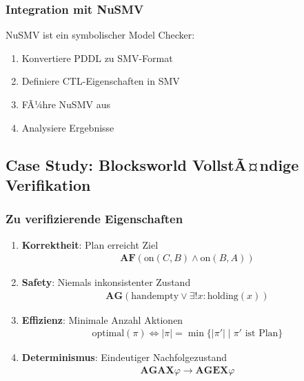 ﻿\documentclass[a4paper,12pt]{article}
\theoremstyle{definition}
\begin{document}
\subsubsection{Integration mit NuSMV}

NuSMV ist ein symbolischer Model Checker:

\begin{enumerate}
	\item Konvertiere PDDL zu SMV-Format
	\item Definiere CTL-Eigenschaften in SMV
	\item FÃ¼hre NuSMV aus
	\item Analysiere Ergebnisse
\end{enumerate}

\subsection{Case Study: Blocksworld VollstÃ¤ndige Verifikation}

\subsubsection{Zu verifizierende Eigenschaften}

\begin{enumerate}
	\item \textbf{Korrektheit}: Plan erreicht Ziel
	\begin{align}
	\mathbf{AF}(\text{on}(C, B) \land \text{on}(B, A))
	\end{align}
	
	\item \textbf{Safety}: Niemals inkonsistenter Zustand
	\begin{align}
	\mathbf{AG}(\text{handempty} \lor \exists! x: \text{holding}(x))
	\end{align}
	
	\item \textbf{Effizienz}: Minimale Anzahl Aktionen
	\begin{align}
	\text{optimal}(\pi) \iff |\pi| = \min\{|\pi'| \mid \pi' \text{ ist Plan}\}
	\end{align}
	
	\item \textbf{Determinismus}: Eindeutiger Nachfolgezustand
	\begin{align}
	\mathbf{AG}\mathbf{AX}\varphi \to \mathbf{AG}\mathbf{EX}\varphi
	\end{align}
\end{enumerate}
\end{document}

